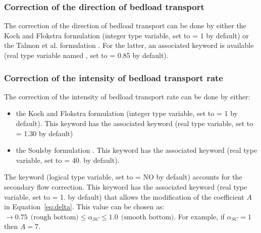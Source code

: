\subsubsection{Correction of the direction of bedload transport}
The correction of the direction of bedload transport can be done by either the Koch and Flokstra formulation  (integer type variable, set to {\ttfamily = 1} by default) or the Talmon et al. formulation . For the latter, an associated keyword is available  (real type variable named , set to {\ttfamily = 0.85} by default).

\subsubsection{Correction of the intensity of bedload transport rate}
The correction of the intensity of bedload transport rate can be done by either:
\begin{itemize}
\item the Koch and Flokstra formulation  (integer type variable, set to {\ttfamily = 1} by default). This keyword has the associated keyword  (real type variable, set to {\ttfamily = 1.30} by default)
\item the Soulsby formulation . This keyword has the associated keyword  (real type variable, set to {\ttfamily = 40.} by default).
\end{itemize}

The keyword  (logical type variable, set to {\ttfamily = NO} by default) accounts for the secondary flow correction. This keyword has the associated keyword  (real type variable, set to {\ttfamily = 1.} by default) that allows the modification of the coefficient $A$ in Equation~\ref{eq:delta}. This value can be chosen as: $\rightarrow 0.75~~\text{(rough bottom)} \leq \alpha_{SC} \leq 1.0~~\text{(smooth bottom)}$. For example, if $\alpha_{SC} = 1$ then $A = 7$.

